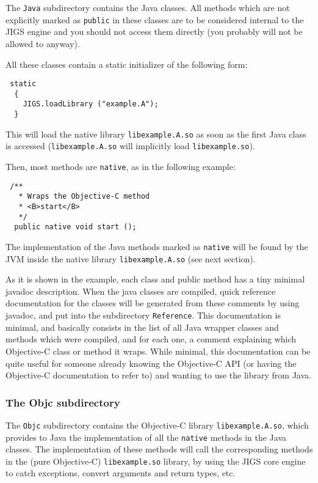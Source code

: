 The \texttt{Java} subdirectory contains the Java classes.  All methods
which are not explicitly marked as \texttt{public} in these classes
are to be considered internal to the JIGS engine and you should not
access them directly (you probably will not be allowed to anyway).

All these classes contain a static initializer of the following form:
\begin{verbatim}
 static
  {
    JIGS.loadLibrary ("example.A");
  }
\end{verbatim}
This will load the native library \texttt{libexample.A.so} as soon as
the first Java class is accessed (\texttt{libexample.A.so} will
implicitly load \texttt{libexample.so}).

Then, most methods are \texttt{native}, as in the following example: 
\begin{verbatim}
 /**
   * Wraps the Objective-C method
   * <B>start</B>
   */
  public native void start ();
\end{verbatim}

The implementation of the Java methods marked as \texttt{native} will
be found by the JVM inside the native library \texttt{libexample.A.so}
(see next section).

As it is shown in the example, each class and public method has a tiny
minimal javadoc description.  When the java classes are compiled,
quick reference documentation for the classes will be generated from
these comments by using javadoc, and put into the subdirectory
\texttt{Reference}.  This documentation is minimal, and basically
consists in the list of all Java wrapper classes and methods which
were compiled, and for each one, a comment explaining which
Objective-C class or method it wraps.  While minimal, this
documentation can be quite useful for someone already knowing the
Objective-C API (or having the Objective-C documentation to refer to)
and wanting to use the library from Java.

\subsubsection{The Objc subdirectory}

The \texttt{Objc} subdirectory contains the Objective-C library 
\texttt{libexample.A.so}, which provides to Java the implementation 
of all the \texttt{native} methods in the Java classes.  The
implementation of these methods will call the corresponding methods in
the (pure Objective-C) \texttt{libexample.so} library, by using the
JIGS core engine to catch exceptions, convert arguments and return
types, etc.

